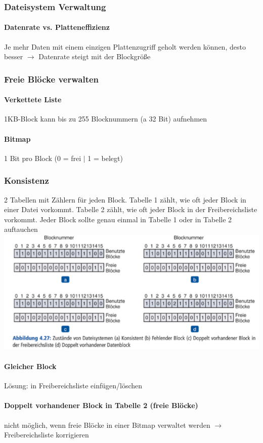 \documentclass[11pt,a4paper,landscape]{article}
\begin{document}
\begin{multicols*}{3}
	\subsubsection{Dateisystem Verwaltung}
	\paragraph{Datenrate vs. Platteneffizienz} Je mehr Daten mit einem einzigen Plattenzugriff geholt werden können, desto besser $\rightarrow$ Datenrate steigt mit der Blockgröße
	\subsubsection{Freie Blöcke verwalten}
	\paragraph{Verkettete Liste} 1KB-Block kann bis zu 255 Blocknummern (a 32 Bit) aufnehmen
	\paragraph{Bitmap} 1 Bit pro Block (0 = frei $\vert$ 1 = belegt)
	\subsubsection{Konsistenz}
	2 Tabellen mit Zählern für jeden Block. Tabelle 1 zählt, wie oft jeder Block in einer Datei vorkommt. Tabelle 2 zählt, wie oft jeder Block in der Freibereichsliste vorkommt. Jeder Block sollte genau einmal in Tabelle 1 oder in Tabelle 2 auftauchen\\
	\includegraphics[width=0.95\columnwidth]{konsistenz}
	\paragraph{Gleicher Block} Lösung: in Freibereichsliste einfügen/löschen
	\paragraph{Doppelt vorhandener Block in Tabelle 2 (freie Blöcke)} nicht möglich, wenn freie Blöcke in einer Bitmap verwaltet werden $\rightarrow$ Freibereichsliste korrigieren

\end{multicols*}
\end{document}
